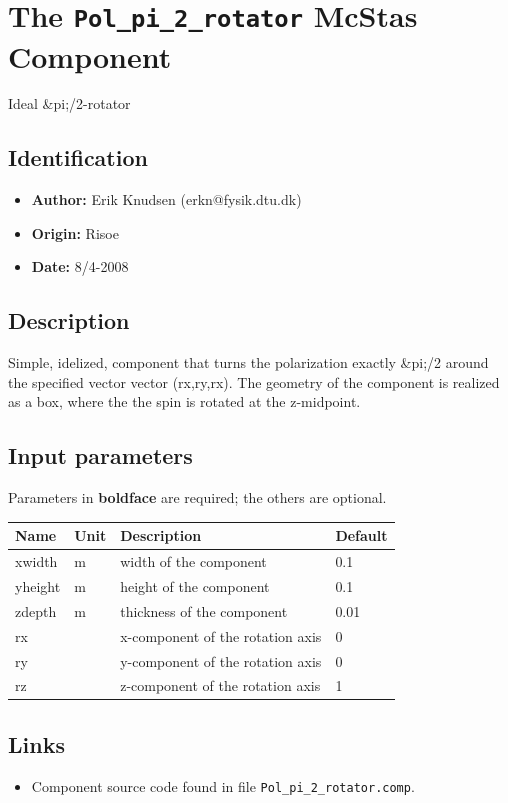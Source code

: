 \section{The \texttt{Pol\_pi\_2\_rotator} McStas Component}
Ideal \&pi;/2-rotator

\subsection*{Identification}
\begin{itemize}
  \item \textbf{Author:} Erik Knudsen (erkn@fysik.dtu.dk)
  \item \textbf{Origin:} Risoe
  \item \textbf{Date:} 8/4-2008
\end{itemize}

\subsection*{Description}
Simple, idelized, component that turns the polarization exactly \&pi;/2 around the specified vector vector (rx,ry,rx). The geometry of the component is realized as a box, where the the spin is rotated at the z-midpoint.

\subsection*{Input parameters}
Parameters in \textbf{boldface} are required; the others are optional.

\begin{longtable}{p{}p{}p{}p{}}
\toprule
\textbf{Name} & \textbf{Unit} & \textbf{Description} & \textbf{Default} \\
\midrule
\endhead
xwidth & m & width of the component & 0.1 \\
yheight & m & height of the component & 0.1 \\
zdepth & m & thickness of the component & 0.01 \\
rx &  & x-component of the rotation axis & 0 \\
ry &  & y-component of the rotation axis & 0 \\
rz &  & z-component of the rotation axis & 1 \\
\bottomrule
\end{longtable}

\subsection*{Links}
\begin{itemize}
  \item Component source code found in file \texttt{Pol\_pi\_2\_rotator.comp}.
\end{itemize}

